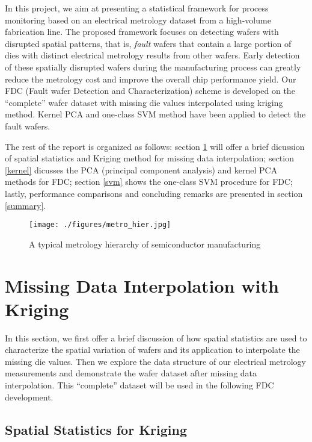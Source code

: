 \documentclass[english]{article}
\numberwithin{equation}{section}
\numberwithin{table}{section}
\numberwithin{figure}{section}
\begin{document}
In this project, we aim at presenting a statistical framework for 
process monitoring based on an electrical metrology dataset from a
high-volume fabrication line. The proposed framework focuses on 
detecting wafers with disrupted spatial patterns, that is,
\emph{fault} wafers that contain a large portion of dies with distinct
electrical metrology results from other wafers. Early detection of
these spatially disrupted wafers during the manufacturing process can
greatly reduce the metrology cost and improve the overall chip performance yield.
Our FDC (Fault wafer Detection and Characterization) scheme is developed on the
``complete'' wafer dataset with missing die values interpolated using kriging
method\cite{Cressie93}. Kernel PCA and one-class SVM method have
been applied to detect the fault wafers.   


The rest of the report is organized as follows: section \ref{kriging}
will offer a brief dicussion of spatial statistics and Kriging method
for missing data interpolation; section \ref{kernel} dicusses the PCA
(principal component analysis) and kernel PCA methods for FDC; section
\ref{svm} shows the one-class SVM procedure for FDC; lastly,
performance comparisons and concluding remarks are presented in section \ref{summary}.

\begin{figure} \centering
  \texttt{[image: ./figures/metro\_hier.jpg]}
  \caption{A typical metrology hierarchy of semiconductor manufacturing}
  \label{metro_hier}
\end{figure}


\section{Missing Data Interpolation with Kriging} \label{kriging}

\hspace{12 pt}
In this section, we first offer a brief discussion of how spatial
statistics are used to characterize the spatial variation of wafers
and its application to interpolate the missing die values. Then we
explore the data structure of our electrical metrology
measurements and demonstrate the wafer dataset after missing data
interpolation. This ``complete'' dataset will be used in the following
FDC development.  


\subsection{Spatial Statistics for Kriging} \label{spatial}
\end{document}
